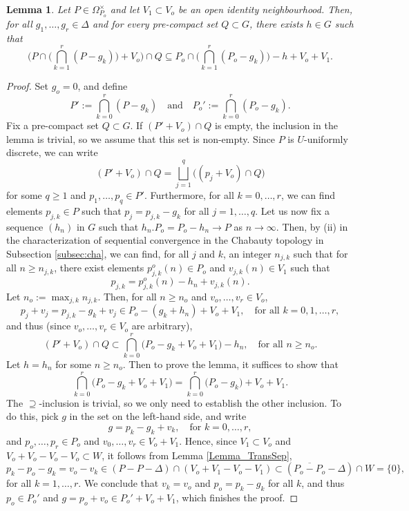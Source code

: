 \documentclass[12pt,reqno,a4paper]{amsart}
\numberwithin{equation}{section}
\newcommand{\ra}{\rightarrow}
\newcommand{\qand}{\quad \textrm{and} \quad}
\theoremstyle{theorem}
\newtheorem{lemma}[theorem]{Lemma}
\theoremstyle{task}
\theoremstyle{definition}
\begin{document}
\begin{lemma}
\label{lemma4}
Let $P \in \Omega_{P_o}^{\times}$ and let $V_1 \subset V_o$ be an open identity neighbourhood. Then, for all $g_1,\ldots,g_r \in \Delta$ and for every 
pre-compact set $Q \subset G$, there exists $h \in G$ such that
\[
\big(P \cap \big( \bigcap_{k=1}^r (P-g_k)\big) + V_o\big) \cap Q
\subseteq P_o \cap \big( \bigcap_{k=1}^r (P_o-g_k)\big) - h + V_o + V_1.
\]
\end{lemma}

\begin{proof}
Set $g_o = 0$, and define
\[
P' := \bigcap_{k=0}^r (P-g_k) \qand P_o' := \bigcap_{k=0}^r (P_o - g_k).
\]
Fix a pre-compact set $Q \subset G$. If $(P' + V_o) \cap Q$ is empty, the inclusion in the lemma is trivial, so we assume that this set is non-empty. Since $P$ is $U$-uniformly discrete, we can write
\[
(P' + V_o) \cap Q = \bigsqcup_{j=1}^q \big((p_j + V_o) \cap Q\big)
\]
for some $q \geq 1$ and $p_1,\ldots,p_q \in P'$. Furthermore, 
for all $k = 0,\ldots,r$, we can find elements $p_{j,k} \in P$ such that 
$p_j = p_{j,k} - g_k$ for all $j=1,\ldots,q$. Let us now fix a sequence $(h_n)$ in $G$
such that $h_n.P_o = P_o - h_n \ra P$ as $n \ra \infty$. Then, by (ii) in the characterization of sequential convergence in the Chabauty topology in Subsection \ref{subsec:cha}, we 
can find, for all $j$ and $k$, an integer $n_{j,k}$ such that for all $n \geq n_{j,k}$,
there exist elements $p^o_{j,k}(n) \in P_o$ and $v_{j,k}(n) \in V_1$ such that
\[
p_{j,k} = p^o_{j,k}(n) - h_n + v_{j,k}(n).
\]
Let $n_o := \max_{j,k} n_{j,k}$. Then, for all $n \geq n_o$ and $v_o,\ldots,v_r \in V_o$,
\[
p_j + v_j = p_{j,k} - g_k + v_j \in P_o - (g_k+h_n) + V_o + V_1 , \quad \textrm{for all $k=0,1,\ldots,r$},
\]
and thus (since $v_o,\ldots,v_r \in V_o$ are arbitrary), 
\[
(P' + V_o) \cap Q \subset \bigcap_{k=0}^r \big(P_o - g_k + V_o + V_1\big) - h_n, \quad \textrm{for all $n \geq n_o$}.
\]
Let $h = h_n$ for some $n \geq n_o$. Then to prove the lemma, it suffices to show that
\[
\bigcap_{k=0}^r \big(P_o - g_k + V_o + V_1\big) = \bigcap_{k=0}^r
\big(P_o - g_k\big) + V_o + V_1.
\]
The $\supseteq$-inclusion is trivial, so we only need to establish the other inclusion. 
To do this, pick $g$ in the set on the left-hand side, and write
\[
g = p_k - g_k + v_k, \quad \textrm{for $k=0,\ldots,r$},
\]
and $p_o,\ldots,p_r \in P_o$ and $v_0,\ldots,v_r \in V_o + V_1$. Hence, since $V_1 \subset V_o$ and $V_o + V_o - V_o - V_o \subset W$, it follows from Lemma \ref{Lemma_TransSep},
\[
p_k - p_o - g_k = v_o - v_k \in (P - P - \Delta) \cap (V_o + V_1 - V_o - V_1)
\subset (\overline{P_o - P_o} - \Delta) \cap W = \{0\},
\]
for all $k=1,\ldots,r$. We conclude that $v_k = v_o$ and $p_o = p_k - g_k$ for all 
$k$, and thus $p_o \in P_o'$ and $g = p_o + v_o \in P_o' + V_o + V_1$, which finishes the proof.
\end{proof}
\end{document}
